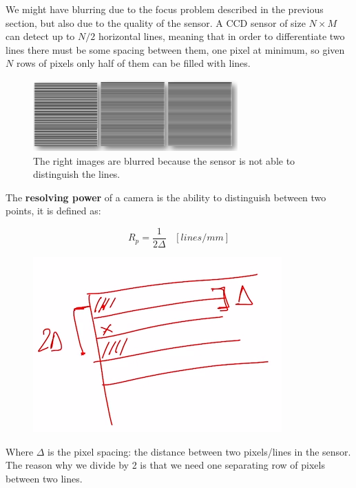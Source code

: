 We might have blurring due to the focus problem described in the previous section, but also due to the quality of the sensor. A CCD sensor of size $N\times M$ can detect up to $N/2$ horizontal lines, meaning that in order to differentiate two lines there must be some spacing between them, one pixel at minimum, so given $N$ rows of pixels only half of them can be filled with lines.

\begin{figure}[H]
    \centering
    \includegraphics[width=0.7\textwidth]{Figures/blur.png}
    \caption{The right images are blurred because the sensor is not able to distinguish the lines.}
    \label{fig:blur}
\end{figure}

The \textbf{resolving power} of a camera is the ability to distinguish between two points, it is defined as:


\begin{multicols}{2}
\[
    R_p = \frac{1}{2\Delta}\;\;\; [lines/mm]     
\]
\begin{figure}[H]
    \includegraphics[scale=0.3]{Figures/separation.png}
\end{figure}
\end{multicols}



Where $\Delta$ is the pixel spacing: the distance between two pixels/lines in the sensor. The reason why we divide by 2 is that we need one separating row of pixels between two lines.